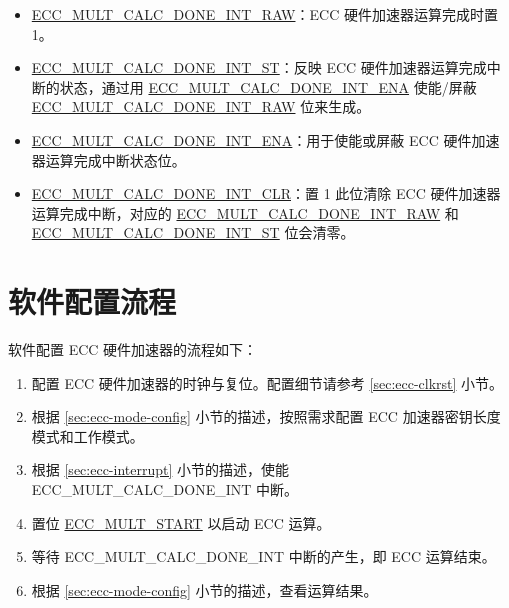 \documentclass[main\_\_CN.tex]{subfiles}
\begin{document}
\begin{itemize}
    \item \hyperref[fielddesc:ECCMULTCALCDONEINTRAW]{ECC\_MULT\_CALC\_DONE\_INT\_RAW}：ECC 硬件加速器运算完成时置 1。
    \item \hyperref[fielddesc:ECCMULTCALCDONEINTST]{ECC\_MULT\_CALC\_DONE\_INT\_ST}：反映 ECC 硬件加速器运算完成中断的状态，通过用 \hyperref[fielddesc:ECCMULTCALCDONEINTENA]{ECC\_MULT\_CALC\_DONE\_INT\_ENA} 使能/屏蔽 \hyperref[fielddesc:ECCMULTCALCDONEINTRAW]{ECC\_MULT\_CALC\_DONE\_INT\_RAW} 位来生成。
    \item \hyperref[fielddesc:ECCMULTCALCDONEINTENA]{ECC\_MULT\_CALC\_DONE\_INT\_ENA}：用于使能或屏蔽 ECC 硬件加速器运算完成中断状态位。
    \item \hyperref[fielddesc:ECCMULTCALCDONEINTCLR]{ECC\_MULT\_CALC\_DONE\_INT\_CLR}：置 1 此位清除 ECC 硬件加速器运算完成中断，对应的 \hyperref[fielddesc:ECCMULTCALCDONEINTRAW]{ECC\_MULT\_CALC\_DONE\_INT\_RAW} 和 \hyperref[fielddesc:ECCMULTCALCDONEINTST]{ECC\_MULT\_CALC\_DONE\_INT\_ST} 位会清零。
\end{itemize}

\section{软件配置流程}

软件配置 ECC 硬件加速器的流程如下：

\begin{enumerate}
    \item 配置 ECC 硬件加速器的时钟与复位。配置细节请参考 \ref{sec:ecc-clkrst} 小节。
    \item 根据 \ref{sec:ecc-mode-config} 小节的描述，按照需求配置 ECC 加速器密钥长度模式和工作模式。
    \item 根据 \ref{sec:ecc-interrupt} 小节的描述，使能 ECC\_MULT\_CALC\_DONE\_INT 中断。
    \item 置位 \hyperref[fielddesc:ECCMULTSTART]{ECC\_MULT\_START} 以启动 ECC 运算。
    \item 等待 ECC\_MULT\_CALC\_DONE\_INT 中断的产生，即 ECC 运算结束。
    \item 根据 \ref{sec:ecc-mode-config} 小节的描述，查看运算结果。
\end{enumerate}


\end{document}
